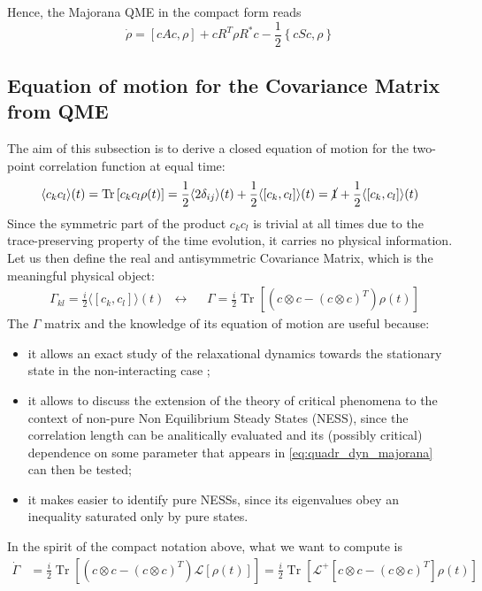 \documentclass[a4paper,11pt]{article}
\DeclareMathOperator{\Tr}{Tr}
\theoremstyle{remark}
\newcommand{\mean}[1]{\ensuremath{\langle #1 \rangle}}
\newcommand{\ro}{\rho}
\newcommand{\nl}{\vskip 0.3cm}
\newcommand{\np}{\vskip 1.3cm}
\begin{document}
  \nl Hence, the Majorana QME in the compact form reads
  \begin{equation}
   \label{eq:quadr_dyn_majorana}
   \dot{\ro}=\left[cAc,\ro\right]+cR^T\ro R^*c - \frac{1}{2}\left\{cSc,\ro\right\}
  \end{equation}
  \np
  
  \subsection{Equation of motion for the Covariance Matrix from QME}
  The aim of this subsection is to derive a closed equation of motion for the two-point correlation function at equal time: \begin{equation*}
  \mean{c_kc_l}(t)=\Tr\left[c_kc_l\ro(t)\right]=\frac{1}{2}\mean{2\delta_{ij}}(t)+\frac{1}{2}\mean{[c_k,c_l]}(t)=\cancel{1}+\frac{1}{2}\mean{[c_k,c_l]}(t)
  \end{equation*}
  Since the symmetric part of the product $c_kc_l$ is trivial at all times due to the trace-preserving property of the time evolution, it carries no physical information. Let us then define the real and antisymmetric Covariance Matrix, which is the meaningful physical object:
  \begin{align}
   &\Gamma_{kl}=\frac{i}{2}\mean{\left[c_k,c_l\right]}(t) &  \longleftrightarrow & & \Gamma = \frac{i}{2}\Tr\left[\left(c\otimes c - (c\otimes c)^T\right)\ro(t)\right]
   \label{eq:def_covariance}
  \end{align}
  The $\Gamma$ matrix and the knowledge of its equation of motion are useful because:
  \begin{itemize}
   \item it allows an exact study of the relaxational dynamics towards the stationary state in the non-interacting case \cite{Eisert2010};
   \item it allows to discuss the extension of the theory of critical phenomena to the context of non-pure Non Equilibrium Steady States (NESS), since the correlation length can be analitically evaluated and its (possibly critical) dependence on some parameter that appears in \ref{eq:quadr_dyn_majorana} can then be tested;
   \item it makes easier to identify pure NESSs, since its eigenvalues obey an inequality saturated only by pure states.\nl
  \end{itemize}
  In the spirit of the compact notation above, what we want to compute is
  \begin{align*}
   \dot{\Gamma} &=  \frac{i}{2}\Tr\left[\left(c\otimes c - (c\otimes c)^T\right)\mathcal{L}\left[\ro(t)\right]\right]=  \frac{i}{2}\Tr\left[\mathcal{L}^+\!\!\left[c\otimes c - (c\otimes c)^T\right]\ro(t)\right]
  \end{align*}
\end{document}
